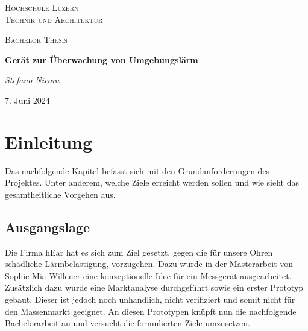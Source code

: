 \documentclass[12pt]{article}
\begin{document}
	\begin{titlepage}
		\centering
		\vspace{1cm}
		{\scshape\LARGE Hochschule Luzern \\ Technik und Architektur \par}
		\vspace{1cm}
		{\scshape\Large Bachelor Thesis\par}
		\vspace{1.5cm}
		{\huge\bfseries Gerät zur Überwachung von Umgebungslärm\par}
		\vspace{2cm}
		{\Large\itshape Stefano Nicora\par}
		
		\vfill
		
		{\large 7. Juni 2024\par}
	\end{titlepage}
	
	\thispagestyle{empty}
	\tableofcontents
	\thispagestyle{empty}
	
	\newpage
	\section{Einleitung}
	Das nachfolgende Kapitel befasst sich mit den Grundanforderungen des Projektes. Unter anderem, welche Ziele erreicht werden sollen und wie sieht das gesamtheitliche Vorgehen aus.
	\setcounter{page}{1} %
	\pagestyle{plain} %
	\subsection{Ausgangslage} \label{Ausgangslage}
	Die Firma hEar hat es sich zum Ziel gesetzt, gegen die für unsere Ohren schädliche Lärmbelästigung, vorzugehen. Dazu wurde in der Masterarbeit von Sophie Mia Willener eine konzeptionelle Idee für ein Messgerät ausgearbeitet. Zusätzlich dazu wurde eine Marktanalyse durchgeführt sowie ein erster Prototyp gebaut. Dieser ist jedoch noch unhandlich, nicht verifiziert und somit nicht für den Massenmarkt geeignet. An diesen Prototypen knüpft nun die nachfolgende Bachelorarbeit an und versucht die formulierten Ziele umzusetzen.
\end{document}
